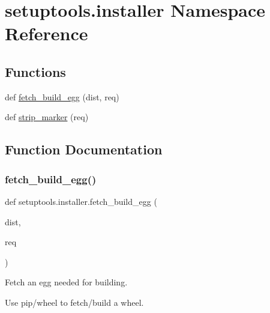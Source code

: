 \hypertarget{namespacesetuptools_1_1installer}{}\section{setuptools.\+installer Namespace Reference}
\label{namespacesetuptools_1_1installer}
\subsection*{Functions}
\begin{DoxyCompactItemize}
\item 
def \hyperlink{namespacesetuptools_1_1installer_a27d66fe10187c391586040e6b039649e}{fetch\+\_\+build\+\_\+egg} (dist, req)
\item 
def \hyperlink{namespacesetuptools_1_1installer_afdf503a562fe3ad6ed3d4a7b05c2fb4f}{strip\+\_\+marker} (req)
\end{DoxyCompactItemize}


\subsection{Function Documentation}
\mbox{\label{namespacesetuptools_1_1installer_a27d66fe10187c391586040e6b039649e}} 
\subsubsection{\texorpdfstring{fetch\+\_\+build\+\_\+egg()}{fetch\_build\_egg()}}
{\footnotesize\ttfamily def setuptools.\+installer.\+fetch\+\_\+build\+\_\+egg (\begin{DoxyParamCaption}\item[{}]{dist,  }\item[{}]{req }\end{DoxyParamCaption})}

\begin{DoxyVerb}Fetch an egg needed for building.

Use pip/wheel to fetch/build a wheel.\end{DoxyVerb}
 \mbox{\label{namespacesetuptools_1_1installer_afdf503a562fe3ad6ed3d4a7b05c2fb4f}} 
